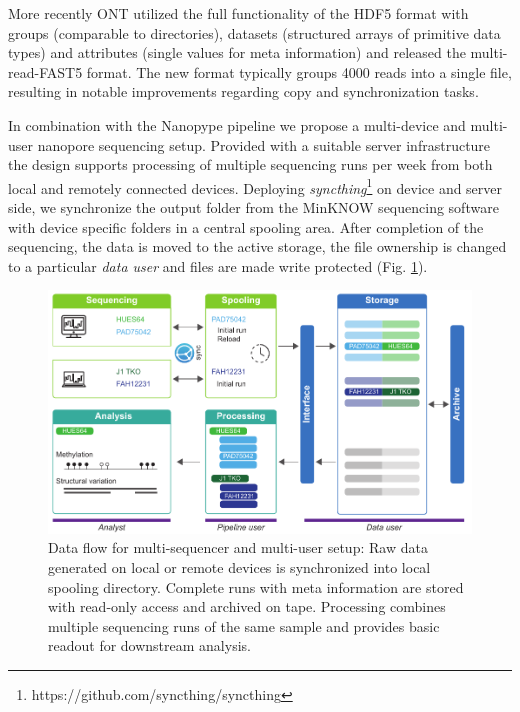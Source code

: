 More recently ONT utilized the full functionality of the HDF5 format with groups (comparable to directories), datasets (structured arrays of primitive data types) and attributes (single values for meta information) and released the multi-read-FAST5 format. The new format typically groups 4000 reads into a single file, resulting in notable improvements regarding copy and synchronization tasks.

In combination with the Nanopype pipeline we propose a multi-device and multi-user nanopore sequencing setup. Provided with a suitable server infrastructure the design supports processing of multiple sequencing runs per week from both local and remotely connected devices. Deploying \textit{syncthing}\footnote{https://github.com/syncthing/syncthing} on device and server side, we synchronize the output folder from the MinKNOW sequencing software with device specific folders in a central spooling area.
After completion of the sequencing, the data is moved to the active storage, the file ownership is changed to a particular \textit{data user} and files are made write protected (Fig. \ref{fig:nanopype:storage}).

\begin{figure}[h]
	\centering
	\includegraphics[width=1.0\textwidth]{figures/nanopype/storage.pdf}
	\captionsetup{format=plain}
	\caption[Nanopype data flow]{Data flow for multi-sequencer and multi-user setup: Raw data generated on local or remote devices is synchronized into local spooling directory. Complete runs with meta information are stored with read-only access and archived on tape. Processing combines multiple sequencing runs of the same sample and provides basic readout for downstream analysis.}
	\label{fig:nanopype:storage}
\end{figure}

